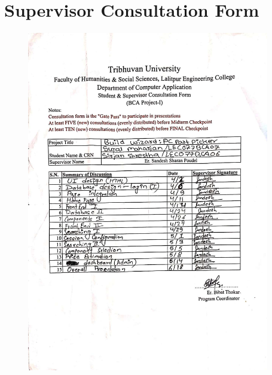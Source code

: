 \newpage
\section{Supervisor Consultation Form}
\begin{figure}[H]
    \centering
    \includegraphics[width=400px]{Diagrams/supervisor.jpg}
\end{figure}


